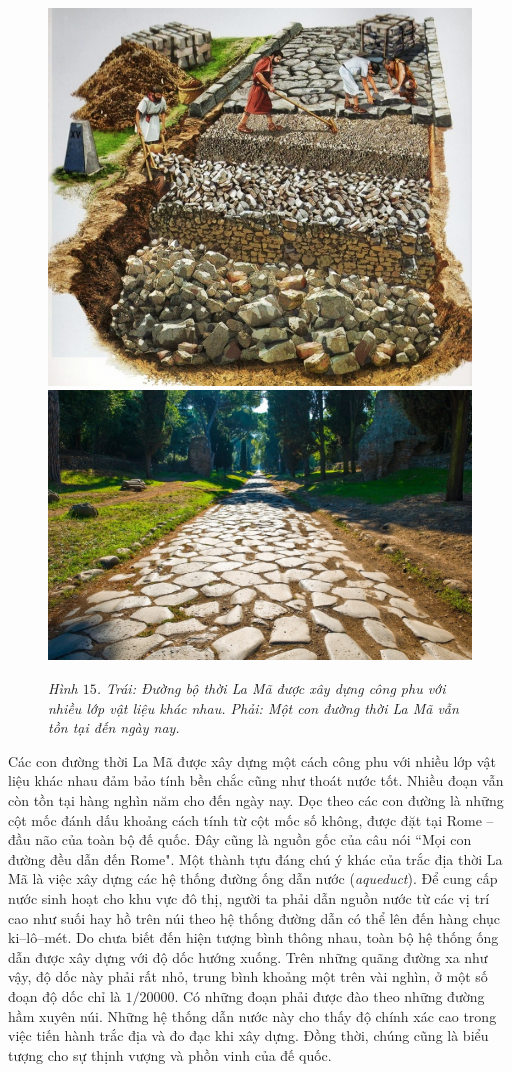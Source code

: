 \begin{multicols}{2}
	\begin{figure}[H]
		\vspace*{-5pt}
		\centering
		\captionsetup{labelformat= empty, justification=centering}
		\includegraphics[height= 0.36\linewidth]{15a}
		\includegraphics[height= 0.36\linewidth]{15b}
		\caption{\small\textit{\color{toanhocdoisong}Hình $15$. Trái: Đường bộ thời La Mã được xây dựng công phu với nhiều lớp vật liệu khác nhau. Phải: Một con đường thời La Mã vẫn tồn tại đến ngày nay.}}
		\vspace*{-10pt}
	\end{figure}
	Các con đường thời La Mã được xây dựng một cách công phu với nhiều lớp vật liệu khác nhau đảm bảo tính bền chắc cũng như thoát nước tốt. Nhiều đoạn vẫn còn tồn tại hàng nghìn năm cho đến ngày nay. Dọc theo các con đường là những cột mốc đánh dấu khoảng cách tính từ cột mốc số không, được đặt tại Rome -- đầu não của toàn bộ đế quốc. Đây cũng là nguồn gốc của câu nói ``Mọi con đường đều dẫn đến Rome".
	\vskip 0.1cm
	Một thành tựu đáng chú ý khác của trắc địa thời La Mã là việc xây dựng các hệ thống đường ống dẫn nước (\textit{aqueduct}). Để cung cấp nước sinh hoạt cho khu vực đô thị, người ta phải dẫn nguồn nước từ các vị trí cao như suối hay hồ trên núi theo hệ thống đường dẫn có thể lên đến hàng chục ki--lô--mét. Do chưa biết đến hiện tượng bình thông nhau, toàn bộ hệ thống ống dẫn được xây dựng với độ dốc hướng xuống. Trên những quãng đường xa như vậy, độ dốc này phải rất nhỏ, trung bình khoảng một trên vài nghìn, ở một số đoạn độ dốc chỉ là $1/20000$. Có những đoạn phải được đào theo những đường hầm xuyên núi. Những hệ thống dẫn nước này cho thấy độ chính xác cao trong việc tiến hành trắc địa và đo đạc khi xây dựng. Đồng thời, chúng cũng là biểu tượng cho sự thịnh vượng và phồn vinh của đế quốc.

\end{multicols}

